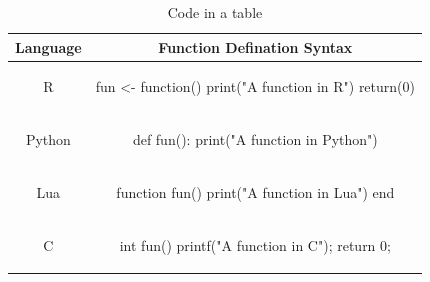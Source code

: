 \begin{table}[htbp]
\centering
  \begin{tabular}{|c | c |}
    \hline
    Language & Function Defination Syntax \\
    \hline
    R & \begin{minipage}{0.75\textwidth}
\vspace{1mm}
\begin{example}
fun <- function(){
  print("A function in R")
  return(0)
}

\end{example}
\end{minipage}\\
\hline
Python & \begin{minipage}{0.75\textwidth}
\vspace{1mm}
\begin{example}
def fun():
  print("A function in Python")

\end{example}
\end{minipage}\\
\hline

Lua & \begin{minipage}{0.75\textwidth}
\vspace{1mm}
\begin{example}
function fun()
  print("A function in Lua")
end

\end{example}
\end{minipage}\\
\hline

C & \begin{minipage}{0.75\textwidth}
\vspace{1mm}
\begin{example}
int fun() {
  printf("A function in C");
  return 0;
}

\end{example}
\end{minipage}\\
\hline
\end{tabular}
\caption{Code in a table}
\label{table:2}
\end{table}

